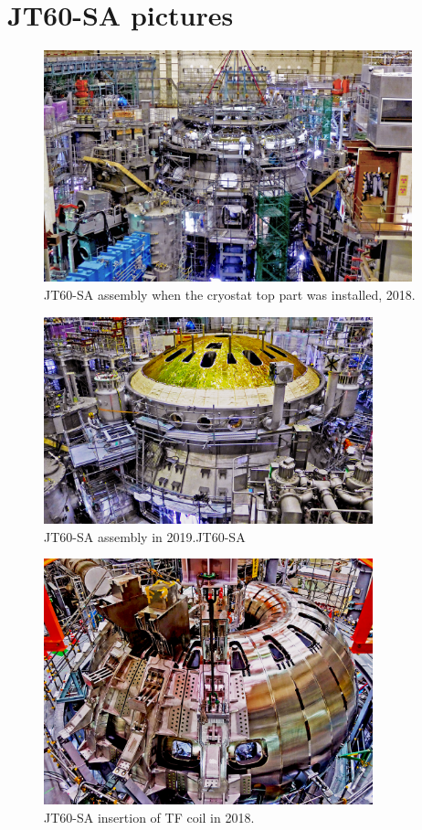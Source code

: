 \chapter{JT60-SA pictures}
\label{JT60_append}
\begin{figure}[h]
	\centering
	\includegraphics[width=0.95\textwidth]{AppCont/image0.jpg}
	\caption{ JT60-SA assembly when the cryostat top part was installed, 2018.\label{figure0}}
\end{figure}
\begin{figure}
	\centering
	\includegraphics[width=0.85\textwidth]{AppCont/image1.jpg}
	\caption{ JT60-SA assembly in 2019.JT60-SA\label{figure1}}
\end{figure}
\begin{figure}
	\centering
	\includegraphics[width=0.85\textwidth]{AppCont/image2.jpg}
	\caption{ JT60-SA insertion of TF coil in 2018.\label{figure2}}
\end{figure}
